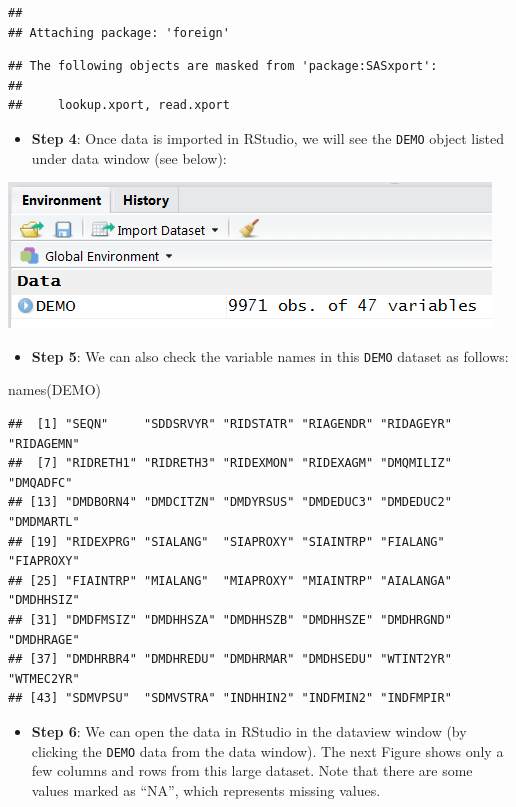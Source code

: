 \documentclass[
]{book}
\newenvironment{Shaded}{\begin{snugshade}}{\end{snugshade}}
\newcommand{\FunctionTok}[1]{\textcolor[rgb]{0.00,0.00,0.00}{#1}}
\newcommand{\NormalTok}[1]{#1}
\providecommand{\tightlist}{%
  \setlength{\itemsep}{0pt}\setlength{\parskip}{0pt}}
\begin{document}
\begin{verbatim}
## 
## Attaching package: 'foreign'
\end{verbatim}

\begin{verbatim}
## The following objects are masked from 'package:SASxport':
## 
##     lookup.xport, read.xport
\end{verbatim}

\begin{itemize}
\tightlist
\item
  \textbf{Step 4}: Once data is imported in RStudio, we will see the \texttt{DEMO} object listed under data window (see below):
\end{itemize}

\includegraphics[width=0.65\linewidth]{images/rdata}

\begin{itemize}
\tightlist
\item
  \textbf{Step 5}: We can also check the variable names in this \texttt{DEMO} dataset as follows:
\end{itemize}

\begin{Shaded}
\begin{Highlighting}[]
\FunctionTok{names}\NormalTok{(DEMO)}
\end{Highlighting}
\end{Shaded}

\begin{verbatim}
##  [1] "SEQN"     "SDDSRVYR" "RIDSTATR" "RIAGENDR" "RIDAGEYR" "RIDAGEMN"
##  [7] "RIDRETH1" "RIDRETH3" "RIDEXMON" "RIDEXAGM" "DMQMILIZ" "DMQADFC" 
## [13] "DMDBORN4" "DMDCITZN" "DMDYRSUS" "DMDEDUC3" "DMDEDUC2" "DMDMARTL"
## [19] "RIDEXPRG" "SIALANG"  "SIAPROXY" "SIAINTRP" "FIALANG"  "FIAPROXY"
## [25] "FIAINTRP" "MIALANG"  "MIAPROXY" "MIAINTRP" "AIALANGA" "DMDHHSIZ"
## [31] "DMDFMSIZ" "DMDHHSZA" "DMDHHSZB" "DMDHHSZE" "DMDHRGND" "DMDHRAGE"
## [37] "DMDHRBR4" "DMDHREDU" "DMDHRMAR" "DMDHSEDU" "WTINT2YR" "WTMEC2YR"
## [43] "SDMVPSU"  "SDMVSTRA" "INDHHIN2" "INDFMIN2" "INDFMPIR"
\end{verbatim}

\begin{itemize}
\tightlist
\item
  \textbf{Step 6}: We can open the data in RStudio in the dataview window (by clicking the \texttt{DEMO} data from the data window). The next Figure shows only a few columns and rows from this large dataset. Note that there are some values marked as ``NA'', which represents missing values.
\end{itemize}
\end{document}

